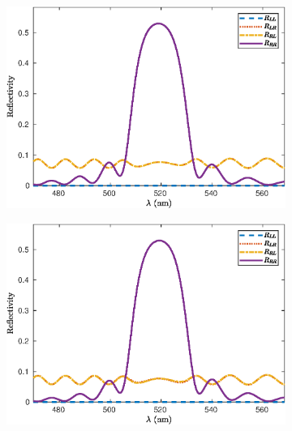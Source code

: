 \begin{figure}
	\centering
	\begin{subfigure}{0.32\linewidth}
		\includegraphics[width=\linewidth]{plots/simple/reflection_oseen}
		\caption{}
		\label{fig:simple_cavity:reflection_oseen}
	\end{subfigure}
	\begin{subfigure}{0.32\linewidth}
		\includegraphics[width=\linewidth]{plots/simple/reflection_cwt}
		\caption{}
		\label{fig:simple_cavity:reflection_cwt}
	\end{subfigure}
	\begin{subfigure}{0.32\linewidth}

\end{subfigure}
\end{figure}
